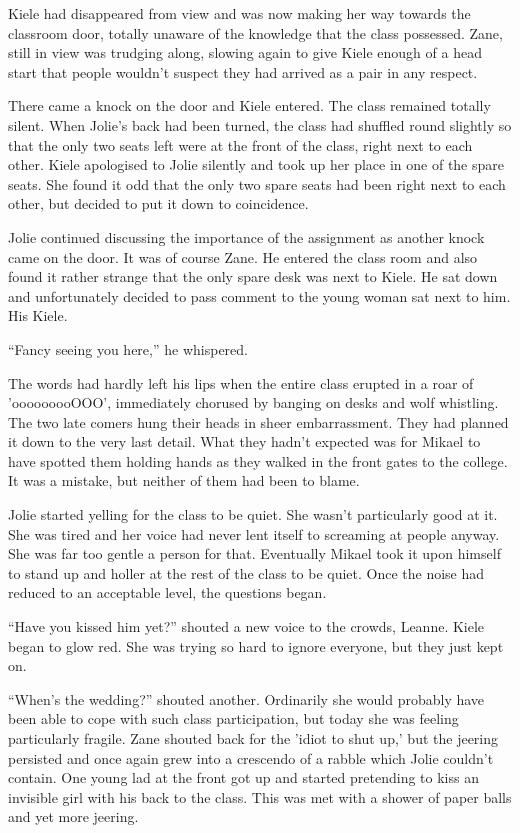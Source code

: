Kiele had disappeared from view and was now making her way towards the classroom door, totally unaware of the knowledge that the class possessed.  Zane, still in view was trudging along, slowing again to give Kiele enough of a head start that people wouldn't suspect they had arrived as a pair in any respect.

There came a knock on the door and Kiele entered.  The class remained totally silent.  When Jolie's back had been turned, the class had shuffled round slightly so that the only two seats left were at the front of the class, right next to each other.  Kiele apologised to Jolie silently and took up her place in one of the spare seats.  She found it odd that the only two spare seats had been right next to each other, but decided to put it down to coincidence.

Jolie continued discussing the importance of the assignment as another knock came on the door.  It was of course Zane.  He entered the class room and also found it rather strange that the only spare desk was next to Kiele.  He sat down and unfortunately decided to pass comment to the young woman sat next to him.  His Kiele.

``Fancy seeing you here,'' he whispered.  

The words had hardly left his lips when the entire class erupted in a roar of 'ooooooooOOO', immediately chorused by banging on desks and wolf whistling.  The two late comers hung their heads in sheer embarrassment.  They had planned it down to the very last detail.  What they hadn't expected was for Mikael to have spotted them holding hands as they walked in the front gates to the college.  It was a mistake, but neither of them had been to blame.

Jolie started yelling for the class to be quiet.  She wasn't particularly good at it.  She was tired and her voice had never lent itself to screaming at people anyway.  She was far too gentle a person for that.  Eventually Mikael took it upon himself to stand up and holler at the rest of the class to be quiet.  Once the noise had reduced to an acceptable level, the questions began.  

``Have you kissed him yet?'' shouted a new voice to the crowds, Leanne.  Kiele began to glow red.  She was trying so hard to ignore everyone, but they just kept on.

``When's the wedding?'' shouted another.  Ordinarily she would probably have been able to cope with such class participation, but today she was feeling particularly fragile.  Zane shouted back for the 'idiot to shut up,' but the jeering persisted and once again grew into a crescendo of a rabble which Jolie couldn't contain.  One young lad at the front got up and started pretending to kiss an invisible girl with his back to the class.  This was met with a shower of paper balls and yet more jeering.  

